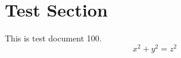 \documentclass{article}
\begin{document}
\section{Test Section}
This is test document 100.
\begin{equation}
x^2 + y^2 = z^2
\end{equation}
\end{document}
